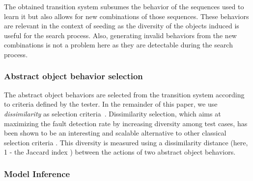 The obtained transition system subsumes the behavior of the sequences used to learn it but also allows for new combinations of those sequences.  These behaviors are relevant in the context of seeding as the diversity of the objects induced is useful for the search process. Also, generating invalid behaviors from the new combinations is not a problem here as they are detectable during the search process.




\subsubsection{Abstract object behavior selection}

The abstract object behaviors are selected from the transition system according to criteria defined by the tester. In the remainder of this paper, we use \emph{dissimilarity} as selection criteria~\cite{Cartaxo2011,Hemmati2013}.
Dissimilarity selection, which aims at maximizing the fault detection rate by increasing diversity among test cases, has been shown to be an interesting and scalable alternative to other classical selection criteria \cite{Hemmati2013, mondal2015}.
This diversity is measured using a dissimilarity distance (here, 1 - the Jaccard index \cite{Jaccard1901}) between the actions of two abstract object behaviors.

\subsubsection{Model Inference}

